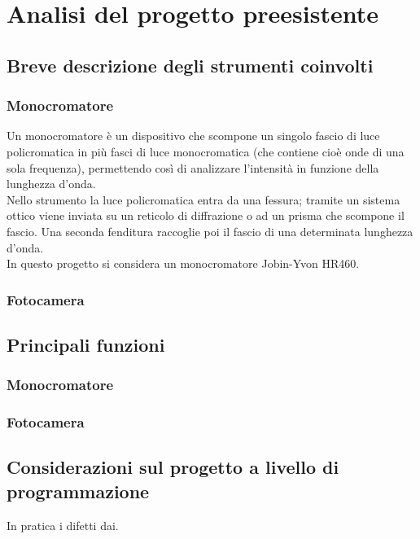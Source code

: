 \chapter{Analisi del progetto preesistente}

\lhead[\fancyplain{}{\bfseries\thepage}]{\fancyplain{}{\bfseries\rightmark}}

\section{Breve descrizione degli strumenti coinvolti}

\subsection{Monocromatore}
Un monocromatore è un dispositivo che scompone un singolo fascio di luce policromatica in più fasci di luce monocromatica (che contiene cioè onde di una sola frequenza), permettendo così di analizzare l'intensità in funzione della lunghezza d'onda.\\

Nello strumento la luce policromatica entra da una fessura; tramite un sistema ottico viene inviata su un reticolo di diffrazione o ad un prisma che scompone il fascio. Una seconda fenditura raccoglie poi il fascio di una determinata lunghezza d'onda.\\
In questo progetto si considera un monocromatore Jobin-Yvon HR460. 
\subsection{Fotocamera}

\section{Principali funzioni}

\subsection{Monocromatore}
\subsection{Fotocamera}

\section{Considerazioni sul progetto a livello di programmazione}

In pratica i difetti dai.